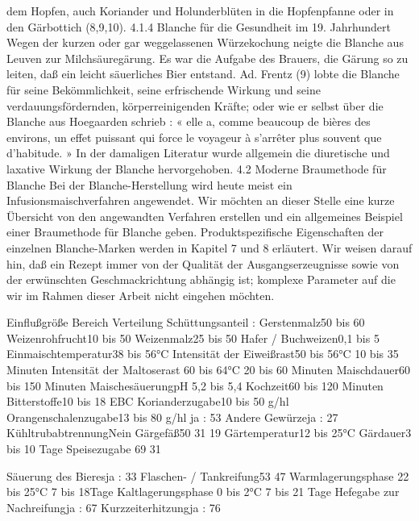 \documentclass[a4paper,parskip=half]{scrartcl}
\begin{document}
dem Hopfen, auch Koriander und Holunderblüten in die Hopfenpfanne oder in den
Gärbottich (8,9,10).
4.1.4 Blanche für die Gesundheit im 19. Jahrhundert
Wegen der kurzen oder gar weggelassenen Würzekochung neigte die Blanche aus
Leuven zur Milchsäuregärung. Es war die Aufgabe des Brauers, die Gärung so zu
leiten, daß ein leicht säuerliches Bier entstand. Ad. Frentz (9) lobte die Blanche für
seine Bekömmlichkeit, seine erfrischende Wirkung und seine verdauungsfördernden,
körperreinigenden Kräfte; oder wie er selbst über die Blanche aus Hoegaarden
schrieb : « elle a, comme beaucoup de bières des environs, un effet puissant qui
force le voyageur à s’arrêter plus souvent que d’habitude. »
In der damaligen Literatur wurde allgemein die diuretische und laxative Wirkung der
Blanche hervorgehoben.
4.2
Moderne Braumethode für Blanche
Bei der Blanche-Herstellung wird heute meist ein Infusionsmaischverfahren
angewendet. Wir möchten an dieser Stelle eine kurze Übersicht von den
angewandten Verfahren erstellen und ein allgemeines Beispiel einer Braumethode
für Blanche geben. Produktspezifische Eigenschaften der einzelnen Blanche-Marken
werden in Kapitel 7 und 8 erläutert. Wir weisen darauf hin, daß ein Rezept immer von
der
Qualität
der
Ausgangserzeugnisse
sowie
von
der
erwünschten
Geschmackrichtung abhängig ist; komplexe Parameter auf die wir im Rahmen dieser
Arbeit nicht eingehen möchten.

\parencite[13]{Strottner1999}

Einflußgröße
Bereich
Verteilung
Schüttungsanteil :
Gerstenmalz50 bis 60 %
Weizenrohfrucht10 bis 50 %
Weizenmalz25 bis 50 %
Hafer / Buchweizen0,1 bis 5 %
Einmaischtemperatur38 bis 56°C
Intensität der Eiweißrast50 bis 56°C
10 bis 35 Minuten
Intensität der Maltoserast
60 bis 64°C
20 bis 60 Minuten
Maischdauer60 bis 150 Minuten
MaischesäuerungpH 5,2 bis 5,4
Kochzeit60 bis 120 Minuten
Bitterstoffe10 bis 18 EBC
Korianderzugabe10 bis 50 g/hl
Orangenschalenzugabe13 bis 80 g/hl
ja : 53 %
Andere Gewürzeja : 27 %
KühltrubabtrennungNein
Gärgefäß50 %
31 %
19 %
Gärtemperatur12 bis 25°C
Gärdauer3 bis 10 Tage
Speisezugabe
69 %
31 %

Säuerung des Bieresja : 33 %
Flaschen- / Tankreifung53 %
47 %
Warmlagerungsphase
22 bis 25°C
7 bis 18Tage
Kaltlagerungsphase
0 bis 2°C
7 bis 21 Tage
Hefegabe zur Nachreifungja : 67 %
Kurzzeiterhitzungja : 76 %

\parencite[14]{Strottner1999}
\end{document}
